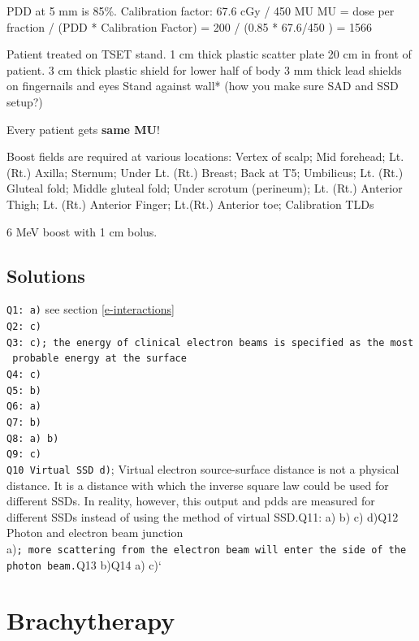 \documentclass[]{book}
\theoremstyle{definition}
\theoremstyle{definition}
\theoremstyle{definition}
\theoremstyle{remark}
\begin{document}
PDD at 5 mm is 85\%. Calibration factor: 67.6 cGy / 450 MU MU = dose per
fraction / (PDD * Calibration Factor) = 200 / (0.85 * 67.6/450 ) = 1566

Patient treated on TSET stand. 1 cm thick plastic scatter plate 20 cm in
front of patient. 3 cm thick plastic shield for lower half of body 3 mm
thick lead shields on fingernails and eyes Stand against wall* (how you
make sure SAD and SSD setup?)

Every patient gets \textbf{same MU}!

Boost fields are required at various locations: Vertex of scalp; Mid
forehead; Lt. (Rt.) Axilla; Sternum; Under Lt. (Rt.) Breast; Back at T5;
Umbilicus; Lt. (Rt.) Gluteal fold; Middle gluteal fold; Under scrotum
(perineum); Lt. (Rt.) Anterior Thigh; Lt. (Rt.) Anterior Finger;
Lt.(Rt.) Anterior toe; Calibration TLDs

6 MeV boost with 1 cm bolus.

\section{Solutions}\label{e-solu}

\texttt{Q1:\ a)} see section \ref{e-interactions}\\
\texttt{Q2:\ c)}\\
\texttt{Q3:\ c);\ the\ energy\ of\ clinical\ electron\ beams\ is\ specified\ as\ the\ most\ probable\ energy\ at\ the\ surface}\\
\texttt{Q4:\ c)}\\
\texttt{Q5:\ b)}\\
\texttt{Q6:\ a)}\\
\texttt{Q7:\ b)}\\
\texttt{Q8:\ a)\ b)}\\
\texttt{Q9:\ c)}\\
\texttt{Q10\ Virtual\ SSD\ d)}; Virtual electron source-surface distance
is not a physical distance. It is a distance with which the inverse
square law could be used for different SSDs. In reality, however, this
output and pdds are measured for different SSDs instead of using the
method of virtual SSD.\texttt{}Q11: a) b) c) d)\texttt{}Q12 Photon and
electron beam junction
a)\texttt{;\ more\ scattering\ from\ the\ electron\ beam\ will\ enter\ the\ side\ of\ the\ photon\ beam.}Q13
b)\texttt{}Q14 a) c)`

\chapter{Brachytherapy}\label{brachy}
\end{document}
